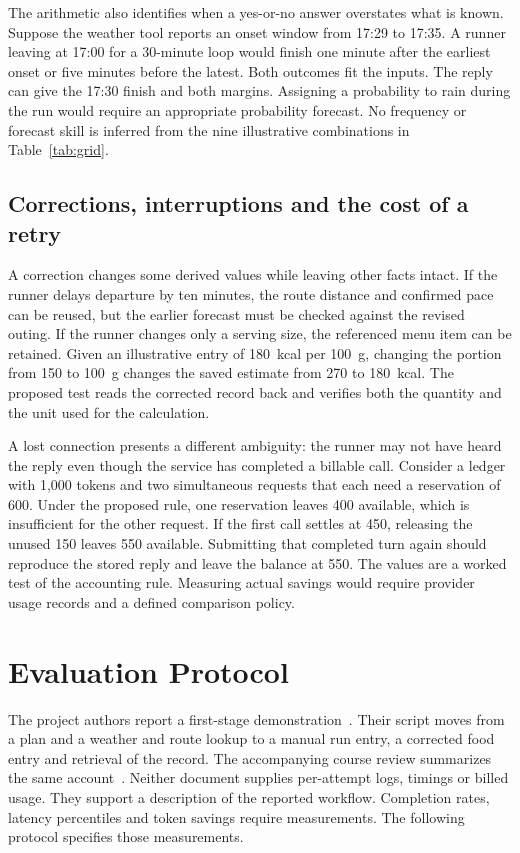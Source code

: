 \documentclass[conference]{IEEEtran}
\begin{document}
The arithmetic also identifies when a yes-or-no answer overstates what is known. Suppose the weather tool reports an onset window from 17:29 to 17:35. A runner leaving at 17:00 for a 30-minute loop would finish one minute after the earliest onset or five minutes before the latest. Both outcomes fit the inputs. The reply can give the 17:30 finish and both margins. Assigning a probability to rain during the run would require an appropriate probability forecast. No frequency or forecast skill is inferred from the nine illustrative combinations in Table~\ref{tab:grid}.

\subsection{Corrections, interruptions and the cost of a retry}
A correction changes some derived values while leaving other facts intact. If the runner delays departure by ten minutes, the route distance and confirmed pace can be reused, but the earlier forecast must be checked against the revised outing. If the runner changes only a serving size, the referenced menu item can be retained. Given an illustrative entry of 180~kcal per 100~g, changing the portion from 150 to 100~g changes the saved estimate from 270 to 180~kcal. The proposed test reads the corrected record back and verifies both the quantity and the unit used for the calculation.

A lost connection presents a different ambiguity: the runner may not have heard the reply even though the service has completed a billable call. Consider a ledger with 1,000 tokens and two simultaneous requests that each need a reservation of 600. Under the proposed rule, one reservation leaves 400 available, which is insufficient for the other request. If the first call settles at 450, releasing the unused 150 leaves 550 available. Submitting that completed turn again should reproduce the stored reply and leave the balance at 550. The values are a worked test of the accounting rule. Measuring actual savings would require provider usage records and a defined comparison policy.

\section{Evaluation Protocol}
The project authors report a first-stage demonstration~\cite[pp.~1, 3--4]{proposal}. Their script moves from a plan and a weather and route lookup to a manual run entry, a corrected food entry and retrieval of the record. The accompanying course review summarizes the same account~\cite{project}. Neither document supplies per-attempt logs, timings or billed usage. They support a description of the reported workflow. Completion rates, latency percentiles and token savings require measurements. The following protocol specifies those measurements.
\end{document}

